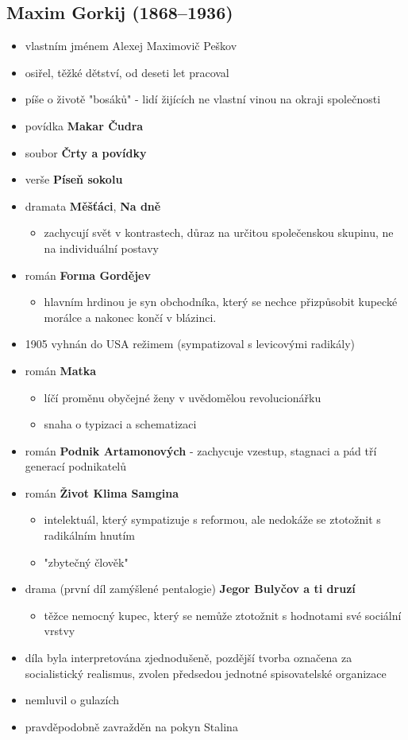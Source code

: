 \subsection{Maxim Gorkij (1868--1936)}
\begin{itemize}
\item vlastním jménem Alexej Maximovič Peškov
\item osiřel, těžké dětství, od deseti let pracoval 
\item píše o životě "bosáků" - lidí žijících ne vlastní vinou na okraji společnosti
\item povídka \textbf{Makar Čudra} 
\item soubor \textbf{Črty a povídky} 
\item verše \textbf{Píseň sokolu}
\item dramata \textbf{Měšťáci}, \textbf{Na dně}
	\begin{itemize}
	\item zachycují svět v kontrastech, důraz na určitou společenskou skupinu, ne na individuální postavy
	\end{itemize}
\item román \textbf{Forma Gordějev}
	\begin{itemize}
	\item hlavním hrdinou je syn obchodníka, který se nechce přizpůsobit kupecké morálce a nakonec končí v blázinci.
	\end{itemize}
\item 1905 vyhnán do USA režimem (sympatizoval s levicovými radikály)
\item román \textbf{Matka}
	\begin{itemize}
	\item líčí proměnu obyčejné ženy v uvědomělou revolucionářku
	\item snaha o typizaci a schematizaci
	\end{itemize}
\item román \textbf{Podnik Artamonových} - zachycuje vzestup, stagnaci a pád tří generací podnikatelů
\item román \textbf{Život Klima Samgina}
	\begin{itemize}
	\item intelektuál, který sympatizuje s reformou, ale nedokáže se ztotožnit s radikálním hnutím
	\item "zbytečný člověk"
	\end{itemize}
\item drama (první díl zamýšlené pentalogie) \textbf{Jegor Bulyčov a ti druzí}
	\begin{itemize}
	\item těžce nemocný kupec, který se nemůže ztotožnit s hodnotami své sociální vrstvy
	\end{itemize}
\item díla byla interpretována zjednodušeně, pozdější tvorba označena za socialistický realismus, zvolen předsedou jednotné spisovatelské organizace
\item nemluvil o gulazích
\item pravděpodobně zavražděn na pokyn Stalina
\end{itemize}	
	

